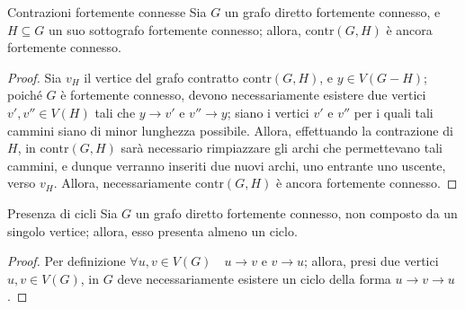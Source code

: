 \documentclass[a4paper, 12pt]{report}
\begin{document}
    \begin{framedthm}[label={contrazioni fortemente connesse}]{Contrazioni fortemente connesse}
        Sia $G$ un grafo diretto fortemente connesso, e $H \subseteq G$ un suo sottografo fortemente connesso; allora, $\mathrm{contr}(G, H)$ è ancora fortemente connesso.
    \end{framedthm}

    \begin{proof}
        Sia $v_H$ il vertice del grafo contratto $\mathrm{contr}(G, H)$, e $y \in V(G - H)$; poiché $G$ è fortemente connesso, devono necessariamente esistere due vertici $v', v'' \in V(H)$ tali che $y \rightarrow v'$ e $v'' \rightarrow y$; siano i vertici $v'$ e $v''$ per i quali tali cammini siano di minor lunghezza possibile. Allora, effettuando la contrazione di $H$, in $\mathrm{contr}(G, H)$ sarà necessario rimpiazzare gli archi che permettevano tali cammini, e dunque verranno inseriti due nuovi archi, uno entrante uno uscente, verso $v_H$. Allora, necessariamente $\mathrm{contr}(G, H)$ è ancora fortemente connesso.
    \end{proof}

    \begin{framedthm}[label={presenza di cicli fort conn}]{Presenza di cicli}
        Sia $G$ un grafo diretto fortemente connesso, non composto da un singolo vertice; allora, esso presenta almeno un ciclo.
    \end{framedthm}

    \begin{proof}
        Per definizione $\forall u, v \in V(G) \quad u \rightarrow v$ e $v \rightarrow u$; allora, presi due vertici $u, v \in V(G)$, in $G$ deve necessariamente esistere un ciclo della forma $u \rightarrow v \rightarrow u$.
    \end{proof}
\end{document}
